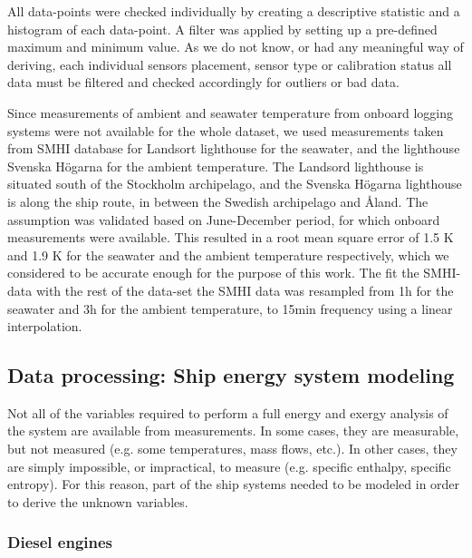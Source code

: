 \documentclass[preprint,12pt]{elsarticle}
\begin{document}
All data-points were checked individually by creating a descriptive statistic and a histogram of each data-point. A filter was applied by setting up a pre-defined maximum and minimum value. As we do not know, or had any meaningful way of deriving, each individual sensors placement, sensor type or calibration status all data must be filtered and checked accordingly for outliers or bad data. 


Since measurements of ambient and seawater temperature from onboard logging systems were not available for the whole dataset, we used measurements taken from SMHI database for Landsort lighthouse for the seawater, and the lighthouse Svenska H\"{o}garna for the ambient temperature. The Landsord lighthouse is situated south of the Stockholm archipelago, and the Svenska H\"{o}garna lighthouse is along the ship route, in between the Swedish archipelago and Åland. The assumption was validated based on  June-December period, for which onboard measurements were available. This resulted in a root mean square error of 1.5 K and 1.9 K for the seawater and the ambient temperature respectively, which we considered to be accurate enough for the purpose of this work. The fit the SMHI-data with the rest of the data-set the SMHI data was resampled from 1h for the seawater and 3h for the ambient temperature, to 15min frequency using a linear interpolation.

\subsection{Data processing: Ship energy system modeling} \label{sec:met:processing}

Not all of the variables required to perform a full energy and exergy analysis of the system are available from measurements. In some cases, they are measurable, but not measured (e.g. some temperatures, mass flows, etc.). In other cases, they are simply impossible, or impractical, to measure (e.g. specific enthalpy, specific entropy). For this reason, part of the ship systems needed to be modeled in order to derive the unknown variables. 




\subsubsection{Diesel engines}
\end{document}
